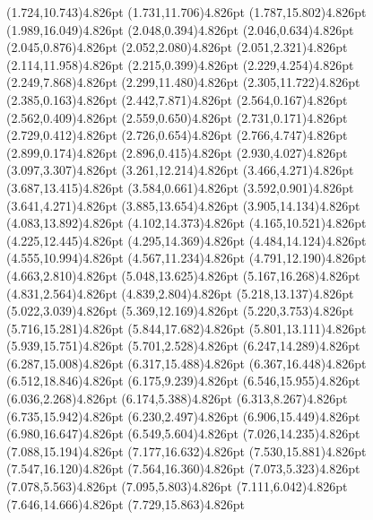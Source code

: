 \documentclass[10pt]{article}
\begin{document}
{{\qdisk(1.724,10.743){4.826pt}%
\qdisk(1.731,11.706){4.826pt}%
\qdisk(1.787,15.802){4.826pt}%
\qdisk(1.989,16.049){4.826pt}%
\qdisk(2.048,0.394){4.826pt}%
\qdisk(2.046,0.634){4.826pt}%
\qdisk(2.045,0.876){4.826pt}%
\qdisk(2.052,2.080){4.826pt}%
\qdisk(2.051,2.321){4.826pt}%
\qdisk(2.114,11.958){4.826pt}%
\qdisk(2.215,0.399){4.826pt}%
\qdisk(2.229,4.254){4.826pt}%
\qdisk(2.249,7.868){4.826pt}%
\qdisk(2.299,11.480){4.826pt}%
\qdisk(2.305,11.722){4.826pt}%
\qdisk(2.385,0.163){4.826pt}%
\qdisk(2.442,7.871){4.826pt}%
\qdisk(2.564,0.167){4.826pt}%
\qdisk(2.562,0.409){4.826pt}%
\qdisk(2.559,0.650){4.826pt}%
\qdisk(2.731,0.171){4.826pt}%
\qdisk(2.729,0.412){4.826pt}%
\qdisk(2.726,0.654){4.826pt}%
\qdisk(2.766,4.747){4.826pt}%
\qdisk(2.899,0.174){4.826pt}%
\qdisk(2.896,0.415){4.826pt}%
\qdisk(2.930,4.027){4.826pt}%
\qdisk(3.097,3.307){4.826pt}%
\qdisk(3.261,12.214){4.826pt}%
\qdisk(3.466,4.271){4.826pt}%
\qdisk(3.687,13.415){4.826pt}%
\qdisk(3.584,0.661){4.826pt}%
\qdisk(3.592,0.901){4.826pt}%
\qdisk(3.641,4.271){4.826pt}%
\qdisk(3.885,13.654){4.826pt}%
\qdisk(3.905,14.134){4.826pt}%
\qdisk(4.083,13.892){4.826pt}%
\qdisk(4.102,14.373){4.826pt}%
\qdisk(4.165,10.521){4.826pt}%
\qdisk(4.225,12.445){4.826pt}%
\qdisk(4.295,14.369){4.826pt}%
\qdisk(4.484,14.124){4.826pt}%
\qdisk(4.555,10.994){4.826pt}%
\qdisk(4.567,11.234){4.826pt}%
\qdisk(4.791,12.190){4.826pt}%
\qdisk(4.663,2.810){4.826pt}%
\qdisk(5.048,13.625){4.826pt}%
\qdisk(5.167,16.268){4.826pt}%
\qdisk(4.831,2.564){4.826pt}%
\qdisk(4.839,2.804){4.826pt}%
\qdisk(5.218,13.137){4.826pt}%
\qdisk(5.022,3.039){4.826pt}%
\qdisk(5.369,12.169){4.826pt}%
\qdisk(5.220,3.753){4.826pt}%
\qdisk(5.716,15.281){4.826pt}%
\qdisk(5.844,17.682){4.826pt}%
\qdisk(5.801,13.111){4.826pt}%
\qdisk(5.939,15.751){4.826pt}%
\qdisk(5.701,2.528){4.826pt}%
\qdisk(6.247,14.289){4.826pt}%
\qdisk(6.287,15.008){4.826pt}%
\qdisk(6.317,15.488){4.826pt}%
\qdisk(6.367,16.448){4.826pt}%
\qdisk(6.512,18.846){4.826pt}%
\qdisk(6.175,9.239){4.826pt}%
\qdisk(6.546,15.955){4.826pt}%
\qdisk(6.036,2.268){4.826pt}%
\qdisk(6.174,5.388){4.826pt}%
\qdisk(6.313,8.267){4.826pt}%
\qdisk(6.735,15.942){4.826pt}%
\qdisk(6.230,2.497){4.826pt}%
\qdisk(6.906,15.449){4.826pt}%
\qdisk(6.980,16.647){4.826pt}%
\qdisk(6.549,5.604){4.826pt}%
\qdisk(7.026,14.235){4.826pt}%
\qdisk(7.088,15.194){4.826pt}%
\qdisk(7.177,16.632){4.826pt}%
\qdisk(7.530,15.881){4.826pt}%
\qdisk(7.547,16.120){4.826pt}%
\qdisk(7.564,16.360){4.826pt}%
\qdisk(7.073,5.323){4.826pt}%
\qdisk(7.078,5.563){4.826pt}%
\qdisk(7.095,5.803){4.826pt}%
\qdisk(7.111,6.042){4.826pt}%
\qdisk(7.646,14.666){4.826pt}%
\qdisk(7.729,15.863){4.826pt}%
}}
\end{document}
